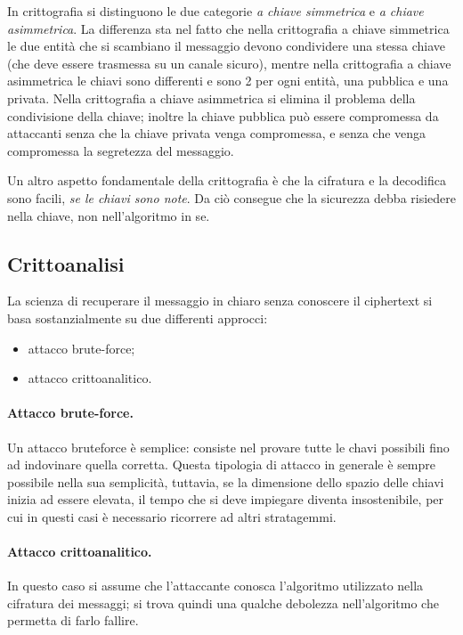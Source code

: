 \documentclass[a4paper, 10pt, twoside]{article}
\begin{document}
	In crittografia si distinguono le due categorie \textit{a chiave simmetrica} e \textit{a chiave asimmetrica}. La differenza sta nel fatto che nella crittografia a chiave simmetrica le due entità che si scambiano il messaggio devono condividere una stessa chiave (che deve essere trasmessa su un canale sicuro), mentre nella crittografia a chiave asimmetrica le chiavi sono differenti e sono 2 per ogni entità, una pubblica e una privata. Nella crittografia a chiave asimmetrica si elimina il problema della condivisione della chiave; inoltre la chiave pubblica può essere compromessa da attaccanti senza che la chiave privata venga compromessa, e senza che venga compromessa la segretezza del messaggio.
	
	Un altro aspetto fondamentale della crittografia è che la cifratura e la decodifica sono facili, \textit{se le chiavi sono note}. Da ciò consegue che la sicurezza debba risiedere nella chiave, non nell'algoritmo in se.
	
	\subsection{Crittoanalisi}
	La scienza di recuperare il messaggio in chiaro senza conoscere il ciphertext si basa sostanzialmente su due differenti approcci:
	\begin{itemize}
		\item attacco brute-force;
		\item attacco crittoanalitico.
	\end{itemize}
	
	\paragraph{Attacco brute-force.} Un attacco bruteforce è semplice: consiste nel provare tutte le chavi possibili fino ad indovinare quella corretta. Questa tipologia di attacco in generale è sempre possibile nella sua semplicità, tuttavia, se la dimensione dello spazio delle chiavi inizia ad essere elevata, il tempo che si deve impiegare diventa insostenibile, per cui in questi casi è necessario ricorrere ad altri stratagemmi.
	
	\paragraph{Attacco crittoanalitico.} In questo caso si assume che l'attaccante conosca l'algoritmo utilizzato nella cifratura dei messaggi; si trova quindi una qualche debolezza nell'algoritmo che permetta di farlo fallire. 
	
\end{document}
